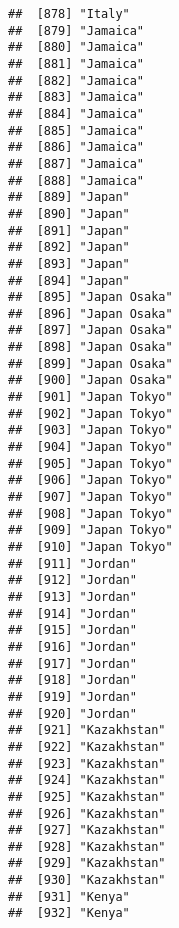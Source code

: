 \documentclass[]{article}
\begin{document}
\begin{verbatim}
##  [878] "Italy"                              
##  [879] "Jamaica"                            
##  [880] "Jamaica"                            
##  [881] "Jamaica"                            
##  [882] "Jamaica"                            
##  [883] "Jamaica"                            
##  [884] "Jamaica"                            
##  [885] "Jamaica"                            
##  [886] "Jamaica"                            
##  [887] "Jamaica"                            
##  [888] "Jamaica"                            
##  [889] "Japan"                              
##  [890] "Japan"                              
##  [891] "Japan"                              
##  [892] "Japan"                              
##  [893] "Japan"                              
##  [894] "Japan"                              
##  [895] "Japan Osaka"                        
##  [896] "Japan Osaka"                        
##  [897] "Japan Osaka"                        
##  [898] "Japan Osaka"                        
##  [899] "Japan Osaka"                        
##  [900] "Japan Osaka"                        
##  [901] "Japan Tokyo"                        
##  [902] "Japan Tokyo"                        
##  [903] "Japan Tokyo"                        
##  [904] "Japan Tokyo"                        
##  [905] "Japan Tokyo"                        
##  [906] "Japan Tokyo"                        
##  [907] "Japan Tokyo"                        
##  [908] "Japan Tokyo"                        
##  [909] "Japan Tokyo"                        
##  [910] "Japan Tokyo"                        
##  [911] "Jordan"                             
##  [912] "Jordan"                             
##  [913] "Jordan"                             
##  [914] "Jordan"                             
##  [915] "Jordan"                             
##  [916] "Jordan"                             
##  [917] "Jordan"                             
##  [918] "Jordan"                             
##  [919] "Jordan"                             
##  [920] "Jordan"                             
##  [921] "Kazakhstan"                         
##  [922] "Kazakhstan"                         
##  [923] "Kazakhstan"                         
##  [924] "Kazakhstan"                         
##  [925] "Kazakhstan"                         
##  [926] "Kazakhstan"                         
##  [927] "Kazakhstan"                         
##  [928] "Kazakhstan"                         
##  [929] "Kazakhstan"                         
##  [930] "Kazakhstan"                         
##  [931] "Kenya"                              
##  [932] "Kenya"                              

\end{verbatim}
\end{document}
